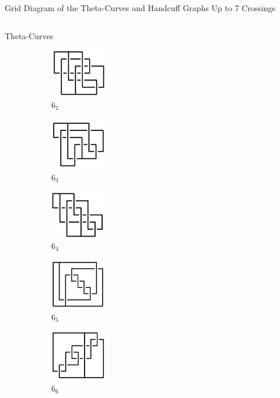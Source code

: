 \documentclass[final]{beamer}
\begin{document}
\begin{frame}[t]
\begin{alertblock}{Grid Diagram of the Theta-Curves and Handcuff Graphs Up to 7 Crossings}
\begin{columns}[t]
\begin{column}{0.7\textwidth}
\begin{alertblock}{Theta-Curves}
\begin{figure}
    \begin{subfigure}{0.075\textwidth}
    \includegraphics[width=2.5cm]{../Midterm_Poster/grid_diagram/theta_6_2.png}
    \caption{$6_2$} 
    \end{subfigure}
    \begin{subfigure}{0.075\textwidth}
    \includegraphics[width=2.5cm]{../Midterm_Poster/grid_diagram/theta_6_3.png}
    \caption{$6_3$} 
    \end{subfigure}
    \begin{subfigure}{0.075\textwidth}
    \includegraphics[width=2.5cm]{../Midterm_Poster/grid_diagram/theta_6_4.png}
    \caption{$6_4$} 
    \end{subfigure}
    \begin{subfigure}{0.075\textwidth}
    \includegraphics[width=2.5cm]{../Midterm_Poster/grid_diagram/theta_6_5.png}
    \caption{$6_5$} 
    \end{subfigure}
    \begin{subfigure}{0.075\textwidth}
    \includegraphics[width=2.5cm]{../Midterm_Poster/grid_diagram/theta_6_6.png}
    \caption{$6_6$} 
    \end{subfigure}
    \begin{subfigure}{0.075\textwidth}

\end{subfigure}
\end{figure}
\end{alertblock}
\end{column}
\end{columns}
\end{alertblock}
\end{frame}
\end{document}
